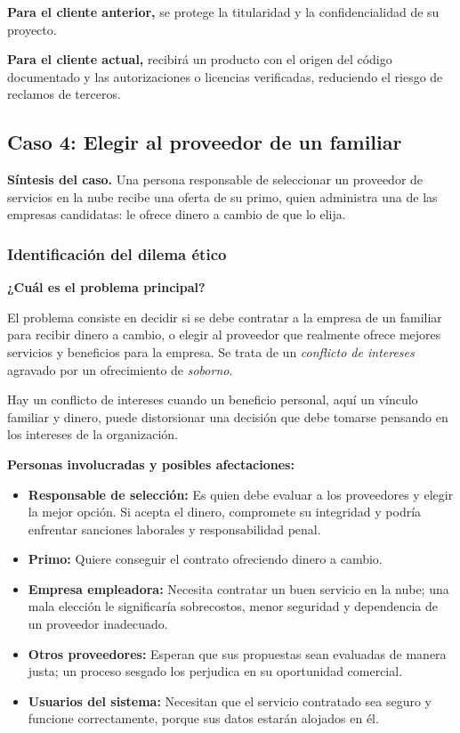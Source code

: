 \documentclass[12pt,a4paper,oneside]{article}
\newcommand{\rotulo}[1]{\par\Needspace{5\baselineskip}\noindent\textbf{#1}\par\nobreak}
\begin{document}
\textbf{Para el cliente anterior,} se protege la titularidad y la confidencialidad de su proyecto.

\textbf{Para el cliente actual,} recibirá un producto con el origen del código documentado y las autorizaciones o licencias verificadas, reduciendo el riesgo de reclamos de terceros.


\subsection{Caso 4: Elegir al proveedor de un familiar}

\textbf{Síntesis del caso.} Una persona responsable de seleccionar un proveedor de servicios en la nube recibe una oferta de su primo, quien administra una de las empresas candidatas: le ofrece dinero a cambio de que lo elija.

\subsubsection{Identificación del dilema ético}

\rotulo{¿Cuál es el problema principal?}

El problema consiste en decidir si se debe contratar a la empresa de un familiar para recibir dinero a cambio, o elegir al proveedor que realmente ofrece mejores servicios y beneficios para la empresa. Se trata de un \emph{conflicto de intereses} agravado por un ofrecimiento de \emph{soborno}.

Hay un conflicto de intereses cuando un beneficio personal, aquí un vínculo familiar y dinero, puede distorsionar una decisión que debe tomarse pensando en los intereses de la organización.

\rotulo{Personas involucradas y posibles afectaciones:}

\begin{itemize}[leftmargin=1.8em,itemsep=3pt]
    \item \textbf{Responsable de selección:} Es quien debe evaluar a los proveedores y elegir la mejor opción. Si acepta el dinero, compromete su integridad y podría enfrentar sanciones laborales y responsabilidad penal.
    \item \textbf{Primo:} Quiere conseguir el contrato ofreciendo dinero a cambio.
    \item \textbf{Empresa empleadora:} Necesita contratar un buen servicio en la nube; una mala elección le significaría sobrecostos, menor seguridad y dependencia de un proveedor inadecuado.
    \item \textbf{Otros proveedores:} Esperan que sus propuestas sean evaluadas de manera justa; un proceso sesgado los perjudica en su oportunidad comercial.
    \item \textbf{Usuarios del sistema:} Necesitan que el servicio contratado sea seguro y funcione correctamente, porque sus datos estarán alojados en él.
\end{itemize}
\end{document}
